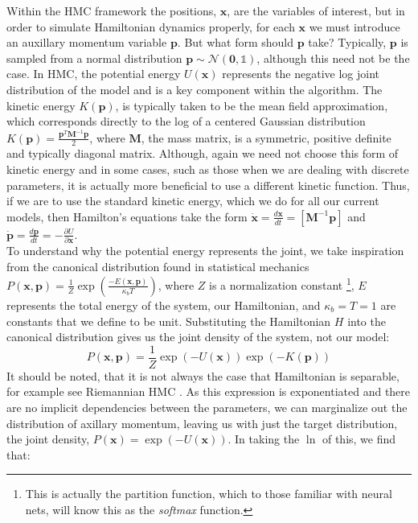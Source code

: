 \documentclass[twoside]{article}
\begin{document}
Within the HMC framework the positions, $\textbf{x}$, are the variables of interest, but in order to simulate Hamiltonian dynamics properly, for each $\textbf{x}$ we must introduce an auxillary momentum variable $\textbf{p}$. But what form should $\textbf{p}$ take? Typically, $\textbf{p}$ is sampled from a normal distribution $\textbf{p} \sim \mathcal{N}(\textbf{0}, \mathds{1})$, although this need not be the case. In HMC, the potential energy $U(\textbf{x})$ represents the negative log joint distribution of the model and is a key component within the algorithm.  The kinetic energy $K(\textbf{p})$, is typically taken to be the mean field approximation, which corresponds directly to the log of a centered Gaussian distribution $K(\textbf{p}) = \frac{\textbf{p}^{T} \textbf{M}^{-1} \textbf{p}}{2}$, where $\textbf{M}$, the mass matrix, is a symmetric, positive definite and typically diagonal matrix. Although, again we need not choose this form of kinetic energy and in some cases, such as those when we are dealing with discrete parameters, it is actually more beneficial to use a different kinetic function\citep{nishimura2017discontinuous}. Thus, if we are to use the standard kinetic energy, which we do for all our current models, then Hamilton's equations take the form $
\dot{\textbf{x}} = \frac{d\textbf{x}}{dt} = [\textbf{M}^{-1}\textbf{p}]$ and $ \dot{\textbf{p}} = \frac{d\textbf{p}}{dt} = -\frac{\partial U}{\partial \textbf{x}}$.\\
To understand why the potential energy represents the joint, we take inspiration from the canonical distribution found in statistical mechanics
$P(\textbf{x},\textbf{p}) = \frac{1}{Z}\exp\left(\frac{-E(\textbf{x},\textbf{p})}{\kappa_{b}T}\right)$,
where $Z$ is a normalization constant \footnote{This is actually the partition function, which to those familiar with neural nets, will know this as the \textit{softmax} function. }, $E$ represents the total energy of the system, our Hamiltonian, and $\kappa_{b} = T = 1$ are constants that we define to be unit. Substituting the Hamiltonian $H$ into the canonical distribution gives us the joint density of the system, not our model:
\begin{equation}
P(\textbf{x},\textbf{p}) = \frac{1}{Z}\exp(-U(\textbf{x}))\exp(-K(\textbf{p})) 
\end{equation}
It should be noted, that it is not always the case that Hamiltonian is separable, for example see Riemannian HMC \citep{girolami2011riemann}. As this expression is exponentiated and there are no implicit dependencies between the parameters, we can marginalize out the distribution of axillary momentum, leaving us with just the target distribution, the joint density, $P(\textbf{x})  = \exp(-U(\textbf{x}))$. In taking the $\ln$ of this, we find that:
\end{document}
